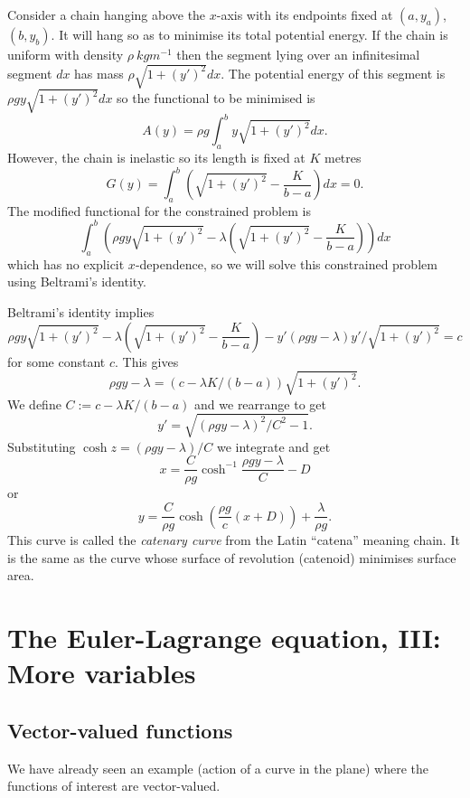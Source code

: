 \begin{exm}[Catenary]
Consider a chain hanging above the $x$-axis with its endpoints fixed at $(a,y_a)$, $(b,y_b)$. It will hang so as to minimise its total potential energy. If the chain is uniform with density $\rho\ kg m^{-1}$ then the segment lying over an infinitesimal segment $dx$ has mass $\rho\sqrt{1+(y')^2}dx$. The potential energy of this segment is $\rho gy\sqrt{1+(y')^2}dx$ so the functional to be minimised is
\[A(y)=\rho g\int_a^by\sqrt{1+(y')^2}dx.\]
However, the chain is inelastic so its length is fixed at $K$ metres
\[G(y)=\int_a^b\left(\sqrt{1+(y')^2}-\frac{K}{b-a}\right)dx=0.\]
The modified functional for the constrained problem is
\[\int_a^b\left(\rho gy\sqrt{1+(y')^2}-\lambda\left(\sqrt{1+(y')^2}-\frac{K}{b-a}\right)\right)dx\]
which has no explicit $x$-dependence, so we will solve this constrained problem using Beltrami's identity.

Beltrami's identity implies
\[\rho gy\sqrt{1+(y')^2}-\lambda\left(\sqrt{1+(y')^2}-\frac{K}{b-a}\right)-y'(\rho gy-\lambda)y'/\sqrt{1+(y')^2}=c\]
for some constant $c$. This gives
\[\rho gy-\lambda=\left(c-\lambda K/(b-a)\right)\sqrt{1+(y')^2}.\]
We define $C:=c-\lambda K/(b-a)$ and we rearrange to get
\[y'=\sqrt{(\rho gy-\lambda)^2/C^2-1}.\]
Substituting $\cosh z=(\rho gy-\lambda)/C$ we integrate and get
\[x=\frac{C}{\rho g}\cosh^{-1}\frac{\rho gy-\lambda}{C}-D\]
or
\[y=\frac{C}{\rho g}\cosh\left(\frac{\rho g}{c}(x+D)\right)+\frac{\lambda}{\rho g}.\]
This curve is called the {\em catenary curve} from the Latin ``catena'' meaning chain. It is the same as the curve whose surface of revolution (catenoid) minimises surface area.
\end{exm}


\chapter[Euler-Lagrange, III]{The Euler-Lagrange equation, III:\\ More variables}

\section{Vector-valued functions}

We have already seen an example (action of a curve in the plane) where the functions of interest are vector-valued.

